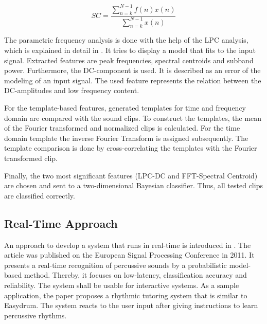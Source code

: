 \begin{equation}
	SC = \frac{\sum_{n=k}^{N-1}f(n)x(n)}{\sum_{n=k}^{N-1}x(n)}
	\label{equation:SC}
\end{equation}

The parametric frequency analysis is done with the help of the LPC analysis, which is explained in detail in \autocite{Christophersen:2007}. It tries to display a model that fits to the input signal. Extracted features are peak frequencies, spectral centroids and subband power. Furthermore, the DC-component is used. It is described as an error of the modeling of an input signal. The used feature represents the relation between the DC-amplitudes and low frequency content.

For the template-based features, generated templates for time and frequency domain are compared with the sound clips. To construct the templates, the mean of the Fourier transformed and normalized clips is calculated. For the time domain template the inverse Fourier Transform is assigned subsequently. The template comparison is done by cross-correlating the templates with the Fourier transformed clip.

Finally, the two most significant features (LPC-DC and FFT-Spectral Centroid) are chosen and sent to a two-dimensional Bayesian classifier. Thus, all tested clips are classified correctly.

\subsection{Real-Time Approach} \label{section:realtimeapproach}

An approach to develop a system that runs in real-time is introduced in \autocite{Simsekli:2011}. The article was published on the European Signal Processing Conference in 2011. It presents a real-time recognition of percussive sounds by a probabilistic model-based method. Thereby, it focuses on low-latency, classification accuracy and reliability. The system shall be usable for interactive systems. As a sample application, the paper proposes a rhythmic tutoring system that is similar to Easydrum. The system reacts to the user input after giving instructions to learn percussive rhythms.

